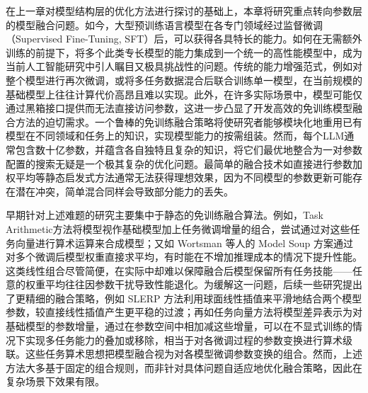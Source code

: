 \documentclass[../main.tex]{subfiles}
\begin{document}


在上一章对模型结构层的优化方法进行探讨的基础上，本章将研究重点转向参数层的模型融合问题。如今，大型预训练语言模型在各专门领域经过监督微调（Supervised Fine-Tuning, SFT）后，可以获得各具特长的能力。如何在无需额外训练的前提下，将多个此类专长模型的能力集成到一个统一的高性能模型中，成为当前人工智能研究中引人瞩目又极具挑战性的问题。传统的能力增强范式，例如对整个模型进行再次微调，或将多任务数据混合后联合训练单一模型，在当前规模的基础模型上往往计算代价高昂且难以实现。此外，在许多实际场景中，模型可能仅通过黑箱接口提供而无法直接访问参数，这进一步凸显了开发高效的免训练模型融合方法的迫切需求。一个鲁棒的免训练融合策略将使研究者能够模块化地重用已有模型在不同领域和任务上的知识，实现模型能力的按需组装。然而，每个LLM通常包含数十亿参数，并蕴含各自独特且复杂的知识，将它们最优地整合为一对参数配置的搜索无疑是一个极其复杂的优化问题。最简单的融合技术如直接进行参数加权平均等静态启发式方法通常无法获得理想效果，因为不同模型的参数更新可能存在潜在冲突，简单混合同样会导致部分能力的丢失。

早期针对上述难题的研究主要集中于静态的免训练融合算法。例如，Task Arithmetic方法将模型视作基础模型加上任务微调增量的组合，尝试通过对这些任务向量进行算术运算来合成模型；又如 Wortsman 等人的 Model Soup 方案通过对多个微调后模型权重直接求平均，有时能在不增加推理成本的情况下提升性能。这类线性组合尽管简便，在实际中却难以保障融合后模型保留所有任务技能——任意的权重平均往往因参数干扰导致性能退化。为缓解这一问题，后续一些研究提出了更精细的融合策略，例如 SLERP 方法利用球面线性插值来平滑地结合两个模型参数，较直接线性插值产生更平稳的过渡；再如任务向量方法将模型差异表示为对基础模型的参数增量，通过在参数空间中相加减这些增量，可以在不显式训练的情况下实现多任务能力的叠加或移除，相当于对各微调过程的参数变换进行算术级联。这些任务算术思想把模型融合视为对各模型微调参数变换的组合。然而，上述方法大多基于固定的组合规则，而非针对具体问题自适应地优化融合策略，因此在复杂场景下效果有限。
\end{document}
